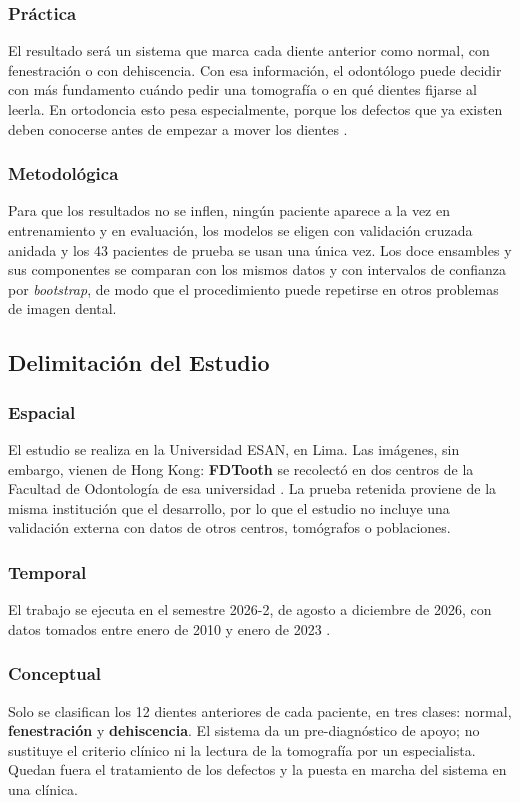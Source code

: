 \documentclass[12pt,a4paper]{article}
\newcommand{\prob}[1]{\textcolor{problema}{\textbf{#1}}}
\newcommand{\dat}[1]{\textcolor{dataset}{\textbf{#1}}}
\newcommand{\prob}[1]{#1}
\newcommand{\dat}[1]{#1}
\begin{document}
\subsubsection{Práctica}
El resultado será un sistema que marca cada diente anterior como normal,
con fenestración o con dehiscencia. Con esa información, el odontólogo
puede decidir con más fundamento cuándo pedir una tomografía o en qué
dientes fijarse al leerla. En ortodoncia esto pesa especialmente, porque
los defectos que ya existen deben conocerse antes de empezar a mover los
dientes \parencite{guo2026consenso}.

\subsubsection{Metodológica}
Para que los resultados no se inflen, ningún paciente aparece a la vez en
entrenamiento y en evaluación, los modelos se eligen con validación
cruzada anidada y los 43 pacientes de prueba se usan una única vez. Los
doce ensambles y sus componentes se comparan con los mismos datos y con intervalos de
confianza por \textit{bootstrap}, de modo que el procedimiento puede
repetirse en otros problemas de imagen dental.

\subsection{Delimitación del Estudio}
\subsubsection{Espacial}
El estudio se realiza en la Universidad ESAN, en Lima. Las imágenes, sin
embargo, vienen de Hong Kong: \dat{FDTooth} se recolectó en dos centros de
la Facultad de Odontología de esa universidad \parencite{liu2025fdtooth}.
La prueba retenida proviene de la misma institución que el desarrollo,
por lo que el estudio no incluye una validación externa con datos de
otros centros, tomógrafos o poblaciones.

\subsubsection{Temporal}
El trabajo se ejecuta en el semestre 2026-2, de agosto a diciembre de
2026, con datos tomados entre enero de 2010 y enero de 2023
\parencite{liu2025fdtooth}.

\subsubsection{Conceptual}
Solo se clasifican los 12 dientes anteriores de cada paciente, en tres
clases: normal, \prob{fenestración} y \prob{dehiscencia}. El sistema da
un pre-diagnóstico de apoyo; no sustituye el criterio clínico ni la
lectura de la tomografía por un especialista. Quedan fuera el tratamiento
de los defectos y la puesta en marcha del sistema en una clínica.
\end{document}
